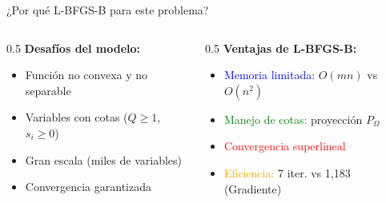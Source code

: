 \documentclass[
  ignorenonframetext,
]{beamer}
\begin{document}
\begin{frame}{¿Por qué L-BFGS-B para este problema?}
\label{por-quuxe9-l-bfgs-b-para-este-problema}
\begin{columns}[T]
\begin{column}{0.5\linewidth}
\textbf{Desafíos del modelo:}

\begin{itemize}
\item Función no convexa y no separable
\item Variables con cotas ($Q \geq 1$, $s_i \geq 0$)
\item Gran escala (miles de variables)
\item Convergencia garantizada
\end{itemize}
\end{column}

\begin{column}{0.5\linewidth}
\textbf{Ventajas de L-BFGS-B:}

\begin{itemize}
\item \textcolor{blue}{Memoria limitada:} $O(mn)$ vs $O(n^2)$
\item \textcolor{green}{Manejo de cotas:} proyección $P_\Omega$
\item \textcolor{red}{Convergencia superlineal}
\item \textcolor{orange}{Eficiencia:} 7 iter. vs 1,183 (Gradiente)
\end{itemize}
\end{column}
\end{columns}
\end{frame}
\end{document}
